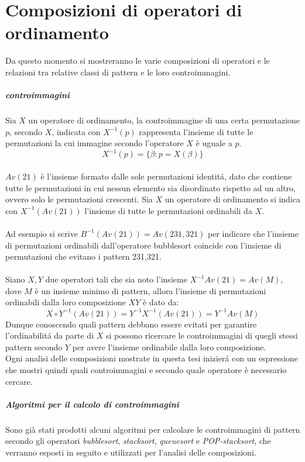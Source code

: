 \chapter{Composizioni di operatori di ordinamento}
Da questo momento si mostreranno le varie composizioni di operatori e le relazioni tra relative classi di pattern e le loro controimmagini.
\paragraph*{controimmagini} Sia $X$ un operatore di ordinamento, la controimmagine di una certa permutazione $p$, secondo $X$, indicata con $X^{-1}(p)$ rappresenta l'insieme di tutte le permutazioni la cui immagine secondo l'operatore $X$ \`e uguale a $p$.$$X^{-1}(p) = \{\beta : p = X(\beta)\}$$\\
$Av(21)$ \`e l'insieme formato dalle sole permutazioni identit\'a, dato che contiene tutte le permutazioni in cui nessun elemento sia disordinato rispetto ad un altro, ovvero solo le permutazioni crescenti. Sia $X$ un operatore di ordinamento si indica con $X^{-1}(Av(21))$ l'insieme di tutte le permutazioni ordinabili da $X$.\\\\
Ad esempio si scrive $B^{-1}(Av(21)) = Av(231,321)$ per indicare che l'insieme di permutazioni ordinabili dall'operatore bubblesort coincide con l'insieme di permutazioni che evitano i pattern 231,321\cite{claesson2012sorting}.
\\\\
Siano $X,Y$ due operatori tali che sia noto l'insieme $X^{-1}Av(21) = Av(M)$, dove $M$ \`e un insieme minimo di pattern, allora l'insieme di permutazioni ordinabili dalla loro composizione $XY$ \`e dato da:
$$X\circ Y^{-1}(Av(21)) = Y^{-1}X^{-1}(Av(21)) = Y^{-1}Av(M)$$ 
Dunque conoscendo quali pattern debbano essere evitati per garantire l'ordinabilit\'a da parte di $X$ si possono ricercare le controimmagini di quegli stessi pattern secondo $Y$ per avere l'insieme ordinabile dalla loro composizione.\\Ogni analisi delle composizioni mostrate in questa tesi inizier\'a con un espressione che mostri quindi quali controimmagini e secondo quale operatore \`e necessario cercare.
\paragraph*{Algoritmi per il calcolo di controimmagini} Sono gi\`a stati prodotti alcuni algoritmi per calcolare le controimmagini di pattern secondo gli operatori \textit{bubblesort}\cite{albert2010inverse}, \textit{stacksort}\cite{claesson2012sorting}, \textit{queuesort}\cite{magnusson2013sorting} e \textit{POP-stacksort}\cite{magnusson2013sorting}, che verranno esposti in seguito e utilizzati per l'analisi delle composizioni.
